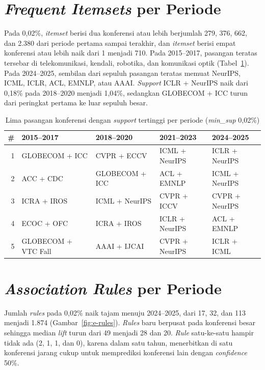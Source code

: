 \section{\textit{Frequent Itemsets} per Periode}
\label{sec:hasil-e-fpm}
Pada 0,02\%, \textit{itemset} berisi dua konferensi atau lebih berjumlah 279, 376, 662, dan 2.380 dari periode pertama sampai terakhir, dan \textit{itemset} berisi empat konferensi atau lebih naik dari 1 menjadi 710. Pada 2015--2017, pasangan teratas tersebar di telekomunikasi, kendali, robotika, dan komunikasi optik (Tabel~\ref{tab:e-pasangan}). Pada 2024--2025, sembilan dari sepuluh pasangan teratas memuat NeurIPS, ICML, ICLR, ACL, EMNLP, atau AAAI. \textit{Support} ICLR + NeurIPS naik dari 0,18\% pada 2018--2020 menjadi 1,04\%, sedangkan GLOBECOM + ICC turun dari peringkat pertama ke luar sepuluh besar.

\begin{table}[!htb]
\caption{Lima pasangan konferensi dengan \textit{support} tertinggi per periode (\textit{min\_sup} 0,02\%)}
\label{tab:e-pasangan}
\footnotesize
\setlength{\tabcolsep}{4pt}
\begin{tabular*}{\textwidth}{@{\extracolsep{\fill}}@{}rllll@{}}
\toprule
\textbf{\#} & \textbf{2015--2017} & \textbf{2018--2020} & \textbf{2021--2023} & \textbf{2024--2025} \\
\midrule
1 & GLOBECOM + ICC & CVPR + ECCV & ICML + NeurIPS & ICLR + NeurIPS \\
2 & ACC + CDC & GLOBECOM + ICC & ACL + EMNLP & ICML + NeurIPS \\
3 & ICRA + IROS & ICML + NeurIPS & CVPR + ICCV & CVPR + NeurIPS \\
4 & ECOC + OFC & ICRA + IROS & ICLR + NeurIPS & ACL + EMNLP \\
5 & GLOBECOM + VTC Fall & AAAI + IJCAI & CVPR + NeurIPS & ICLR + ICML \\
\bottomrule
\end{tabular*}
\end{table}

\section{\textit{Association Rules} per Periode}
\label{sec:hasil-e-rules}
Jumlah \textit{rules} pada 0,02\% naik tajam menuju 2024--2025, dari 17, 32, dan 113 menjadi 1.874 (Gambar~\ref{fig:e-rules}). \textit{Rules} baru berpusat pada konferensi besar sehingga median \textit{lift} turun dari 49 menjadi 28 dan 20. \textit{Rule} satu-ke-satu hampir tidak ada (2, 1, 1, dan 0), karena dalam satu tahun, menerbitkan di satu konferensi jarang cukup untuk memprediksi konferensi lain dengan \textit{confidence} 50\%.

